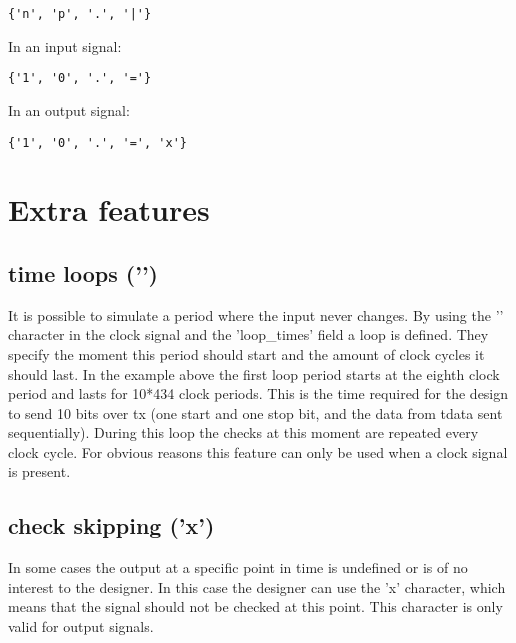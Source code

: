 \textbf{} 
\begin{lstlisting}[style=json]
{'n', 'p', '.', '|'}
\end{lstlisting}
In an input signal: 
\begin{lstlisting}[style=json]
{'1', '0', '.', '='}
\end{lstlisting}
In an output signal: 
\begin{lstlisting}[style=json]
{'1', '0', '.', '=', 'x'}
\end{lstlisting}\newpage
\section{Extra features}
\subsection{time loops ('\textbar')}
It is possible to simulate a period where the input never changes. By using the '\textbar' character in the clock signal and the 'loop\_times' field a loop is defined. They specify the moment this period should start and the amount of clock cycles it should last. In the example above the first loop period starts at the eighth clock period and lasts for 10*434 clock periods. This is the time required for the design to send 10 bits over tx (one start and one stop bit, and the data from tdata sent sequentially). During this loop the checks at this moment are repeated every clock cycle. For obvious reasons this feature can only be used when a clock signal is present.
\subsection{check skipping ('x')}
In some cases the output at a specific point in time is undefined or is of no interest to the designer. In this case the designer can use the 'x' character, which means that the signal should not be checked at this point. This character is only valid for output signals.\newpage
